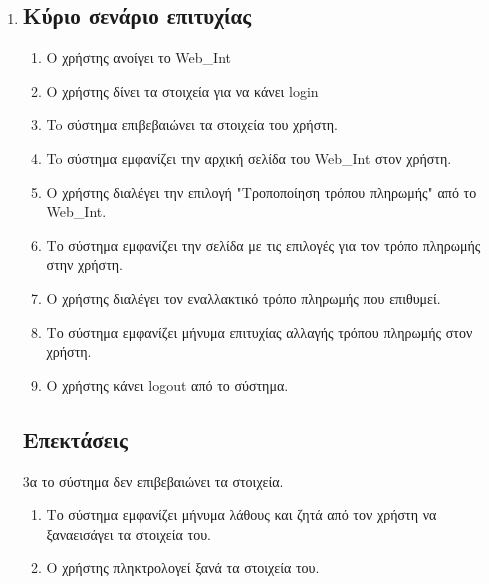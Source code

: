 \documentclass[12pt]{article}
\begin{document}
\begin{enumerate}
\newpage
\item
\subsection*{Κύριο σενάριο επιτυχίας}
\begin{enumerate}[label=\arabic*.]
\item
Ο χρήστης ανοίγει το \textlatin{Web\_Int}
\item
Ο χρήστης δίνει τα στοιχεία για να κάνει \textlatin{login}
\item
To σύστημα επιβεβαιώνει τα στοιχεία του χρήστη.
\item
To σύστημα εμφανίζει την αρχική σελίδα του \textlatin{Web\_Int} στον χρήστη.
\item
Ο χρήστης διαλέγει την επιλογή "Τροποποίηση τρόπου πληρωμής" 
από το \textlatin{Web\_Int}.
\item
Το σύστημα εμφανίζει την σελίδα με τις επιλογές για τον τρόπο 
πληρωμής στην χρήστη.
\item
Ο χρήστης διαλέγει τον εναλλακτικό τρόπο πληρωμής που επιθυμεί.
\item
Το σύστημα εμφανίζει μήνυμα επιτυχίας αλλαγής τρόπου πληρωμής 
στον χρήστη.
\item
Ο χρήστης κάνει \textlatin{logout} από το σύστημα.
\end{enumerate}

\subsection*{Επεκτάσεις}
3α το σύστημα δεν επιβεβαιώνει τα στοιχεία.
\begin{enumerate}[label=\arabic*.]
\item
Το σύστημα εμφανίζει μήνυμα λάθους και ζητά από τον 
χρήστη να ξαναεισάγει τα στοιχεία του.
\item 
Ο χρήστης πληκτρολογεί ξανά τα στοιχεία του.
\end{enumerate}


\end{enumerate}
\end{document}
